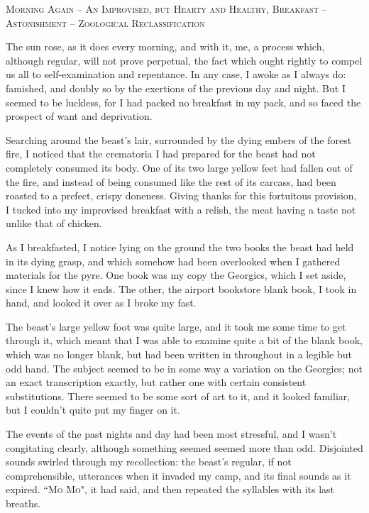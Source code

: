 \par
\begin{center}
\textsc{Morning Again – An Improvised, but Hearty and Healthy, Breakfast – Astonishment – Zoological Reclassification}
\end{center}
\par
The sun rose, as it does every morning, and with it, me, a process which, although regular, will not prove perpetual, the fact which ought rightly to compel us all to self-examination and repentance.  In any case, I awoke as I always do: famished, and doubly so by the exertions of the previous day and night.  But I seemed to be luckless, for I had packed no breakfast in my pack, and so faced the prospect of want and deprivation.
\par
Searching around the beast's lair, surrounded by the dying embers of the forest fire, I noticed that the crematoria I had prepared for the beast had not completely consumed its body.  One of its two large yellow feet had fallen out of the fire, and instead of being consumed like the rest of its carcass, had been roasted to a prefect, crispy doneness.  Giving thanks for this fortuitous provision, I tucked into my improvised breakfast with a relish, the meat having a taste not unlike that of chicken.
\par
As I breakfasted, I notice lying on the ground the two books the beast had held in its dying grasp, and which somehow had been overlooked when I gathered materials for the pyre.  One book was my copy the Georgics, which I set aside, since I knew how it ends.  The other, the airport bookstore blank book, I took in hand, and looked it over as I broke my fast.
\par
The beast's large yellow foot was quite large, and it took me some time to get through it, which meant that I was able to examine quite a bit of the blank book, which was no longer blank, but had been written in throughout in a legible but odd hand.  The subject seemed to be in some way a variation on the Georgics; not an exact transcription exactly, but rather one with certain consistent substitutions.  There seemed to be some sort of art to it, and it looked familiar, but I couldn't quite put my finger on it.
\par
The events of the past nights and day had been most stressful, and I wasn't congitating clearly, although something seemed seemed more than odd.  Disjointed sounds swirled through my recollection: the beast's regular, if not comprehensible, utterances when it invaded my camp, and its final sounds as it expired.  ``\textsc{Mo Mo"}, it had said, and then repeated the syllables with its last breaths.
